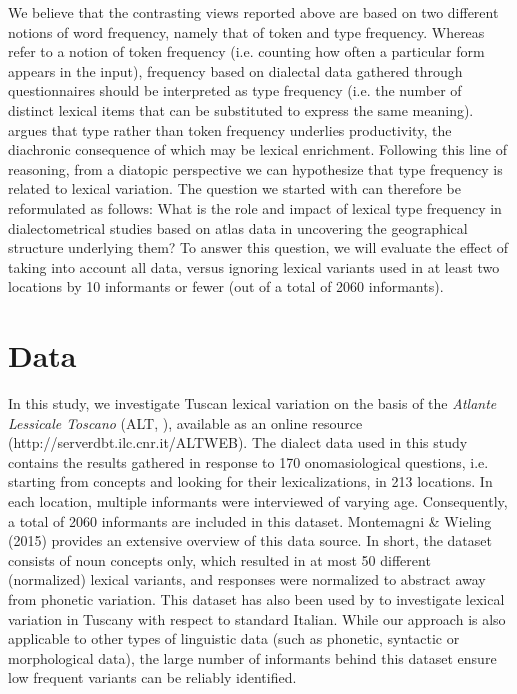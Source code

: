 \documentclass[output=paper]{LSP/langsci}
\begin{document}
We believe that the contrasting views reported above are based on two different notions of word frequency, namely that of token and type frequency. Whereas \citet{manning_foundations_1999} refer to a notion of token frequency (i.e. counting how often a particular form appears in the input), frequency based on dialectal data gathered through questionnaires should be interpreted as type frequency (i.e.  the number of distinct lexical items that can be substituted to express the same meaning). \citet{bybee_phonology_2001} argues that type rather than token frequency underlies productivity, the diachronic consequence of which may be lexical enrichment. Following this line of reasoning, from a diatopic perspective we can hypothesize that type frequency is related  to lexical variation. The question we started with can therefore be reformulated as follows: What is the role and impact of lexical type frequency in dialectometrical studies based on atlas data in uncovering the geographical structure underlying them? To answer this question, we will evaluate the effect of taking into account all data, versus ignoring lexical variants used in at least two locations by 10 informants or fewer (out of a total of 2060 informants).

\section{Data}
In this study, we investigate Tuscan lexical variation on the basis of the \textit{Atlante Lessicale Toscano} (ALT, \citealt{giacomelli_atlante_2000}), available as an online resource (http://serverdbt.ilc.cnr.it/ALTWEB). The dialect data used in this study contains the results gathered in response to 170 onomasiological questions, i.e. starting from concepts and looking for their lexicalizations, in 213 locations. In each location, multiple informants were interviewed of varying age. Consequently, a total of 2060 informants are included in this dataset. Montemagni \& Wieling (2015) provides an extensive overview of this data source. In short, the dataset consists of noun concepts only, which resulted in at most 50 different (normalized) lexical variants, and responses were normalized to abstract away from phonetic variation. This dataset has also been used by \citet{wieling_lexical_2014} to investigate lexical variation in Tuscany with respect to standard Italian. While our approach is also applicable to other types of linguistic data (such as phonetic, syntactic or morphological data), the large number of informants behind this dataset ensure low frequent variants can be reliably identified.
\end{document}
